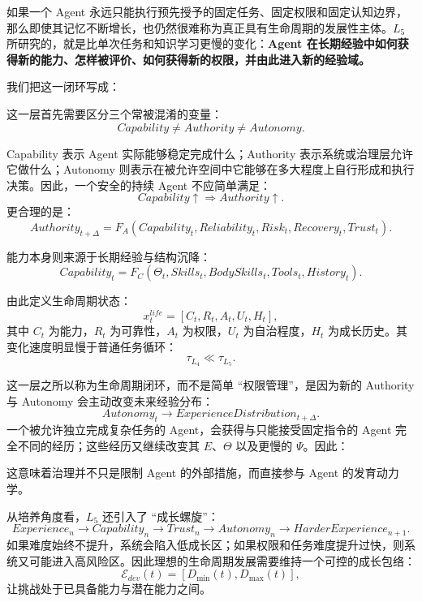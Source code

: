 如果一个 Agent 永远只能执行预先授予的固定任务、固定权限和固定认知边界，那么即使其记忆不断增长，也仍然很难称为真正具有生命周期的发展性主体。$L_5$ 所研究的，就是比单次任务和知识学习更慢的变化：\textbf{Agent 在长期经验中如何获得新的能力、怎样被评价、如何获得新的权限，并由此进入新的经验域。}

我们把这一闭环写成：
\begin{statementbox}
\centering
{}
\end{statementbox}

这一层首先需要区分三个常被混淆的变量：
\[
Capability\neq Authority\neq Autonomy.
\]

Capability 表示 Agent 实际能够稳定完成什么；Authority 表示系统或治理层允许它做什么；Autonomy 则表示在被允许空间中它能够在多大程度上自行形成和执行决策。因此，一个安全的持续 Agent 不应简单满足：
\[
Capability\uparrow
\Rightarrow
Authority\uparrow.
\]
更合理的是：
\[
Authority_{t+\Delta}
=
F_A
\left(
Capability_t,
Reliability_t,
Risk_t,
Recovery_t,
Trust_t
\right).
\]

能力本身则来源于长期经验与结构沉降：
\[
Capability_t
=
F_C
\left(
\Theta_t,
Skills_t,
BodySkills_t,
Tools_t,
History_t
\right).
\]

由此定义生命周期状态：
\[
x^{life}_t
=
\left[
C_t,
R_t,
A_t,
U_t,
H_t
\right],
\]
其中 $C_t$ 为能力，$R_t$ 为可靠性，$A_t$ 为权限，$U_t$ 为自治程度，$H_t$ 为成长历史。其变化速度明显慢于普通任务循环：
\[
\tau_{L_4}
\ll
\tau_{L_5}.
\]

这一层之所以称为生命周期闭环，而不是简单 ``权限管理''，是因为新的 Authority 与 Autonomy 会主动改变未来经验分布：
\[
Autonomy_t
\rightarrow
ExperienceDistribution_{t+\Delta}.
\]
一个被允许独立完成复杂任务的 Agent，会获得与只能接受固定指令的 Agent 完全不同的经历；这些经历又继续改变其 $E$、$\Theta$ 以及更慢的 $\Psi$。因此：
\begin{statementbox}
\centering
{}
\end{statementbox}

这意味着治理并不只是限制 Agent 的外部措施，而直接参与 Agent 的发育动力学。

从培养角度看，$L_5$ 还引入了 ``成长螺旋''：
\[
Experience_n
\rightarrow
Capability_n
\rightarrow
Trust_n
\rightarrow
Autonomy_n
\rightarrow
HarderExperience_{n+1}.
\]
如果难度始终不提升，系统会陷入低成长区；如果权限和任务难度提升过快，则系统又可能进入高风险区。因此理想的生命周期发展需要维持一个可控的成长包络：
\[
\mathcal E_{dev}(t)
=
\left[
D_{\min}(t),
D_{\max}(t)
\right],
\]
让挑战处于已具备能力与潜在能力之间。

